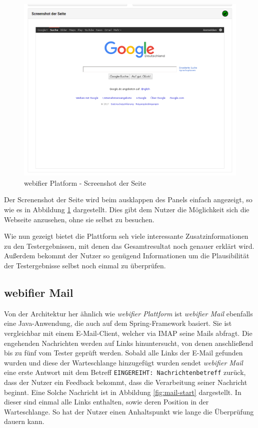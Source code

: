 \begin{figure}[H]
  \centering
  \includegraphics[width=\textwidth]{images/platform/screenshot-clean}
  \caption{webifier Platform - Screenshot der Seite}
  \label{fig:platform-result-screenshot}
\end{figure}

Der Screnenshot der Seite wird beim ausklappen des Panels einfach angezeigt, so wie es in Abbildung \ref{fig:platform-result-screenshot} dargestellt. Dies gibt dem Nutzer die Möglichkeit sich die Webseite anzusehen, ohne sie selbst zu besuchen.

Wie nun gezeigt bietet die Plattform seh viele interessante Zusatzinformationen zu den Testergebnissen, mit denen das Gesamtresultat noch genauer erklärt wird. Außerdem bekommt der Nutzer so genügend Informationen um die Plausibilität der Testergebnisse selbst noch einmal zu überprüfen.

\subsection{webifier Mail}

Von der Architektur her ähnlich wie \textit{webifier Plattform} ist \textit{webifier Mail} ebenfalls eine Java-Anwendung, die auch auf dem Spring-Framework basiert. Sie ist vergleichbar mit einem E-Mail-Client, welcher via IMAP seine Mails abfragt. Die engehenden Nachrichten werden auf Links hinuntersucht, von denen anschließend bis zu fünf vom Tester geprüft werden. Sobald alle Links der E-Mail gefunden wurden und diese der Warteschlange hinzugefügt wurden sendet \textit{webifier Mail} eine erste Antwort mit dem Betreff \lstinline[style=eclipse]{EINGEREIHT: Nachrichtenbetreff} zurück, dass der Nutzer ein Feedback bekommt, dass die Verarbeitung seiner Nachricht beginnt. Eine Solche Nachricht ist in Abbildung \ref{fig:mail-start} dargestellt. In dieser sind einmal alle Links enthalten, sowie deren Position in der Warteschlange. So hat der Nutzer einen Anhaltspunkt wie lange die Überprüfung dauern kann.

